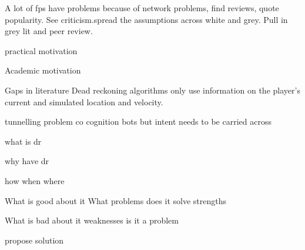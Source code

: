 \documentclass[journal]{IEEEtran}
\begin{document}
A lot of fps have problems because of network problems, find reviews, quote popularity. See criticism.spread the assumptions across white and grey. Pull in grey lit and peer review. \cite{solaire2016reddit} \cite{hp2015bungie}


practical motivation

Academic motivation

Gaps in literature
Dead reckoning algorithms only use information on the player's current and simulated location and velocity.

tunnelling problem
co cognition
bots but intent needs to be carried across



what is dr

why have dr

how when where

What is good about it 
What problems does it solve
strengths

What is bad about it
weaknesses
is it a problem

propose solution







\end{document}
